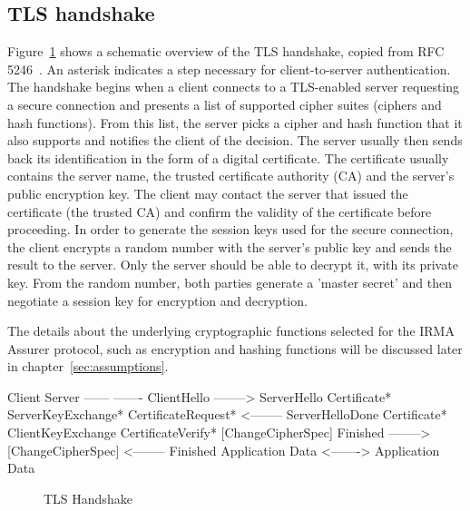 \subsection{TLS handshake}
Figure~\ref{fig:tlshandshake} shows a schematic overview of the TLS handshake, copied from RFC 5246~\cite{tls1.2}. An asterisk indicates a step necessary for client-to-server authentication. The handshake begins when a client connects to a TLS-enabled server requesting a secure connection and presents a list of supported cipher suites (ciphers and hash functions). From this list, the server picks a cipher and hash function that it also supports and notifies the client of the decision. The server usually then sends back its identification in the form of a digital certificate. The certificate usually contains the server name, the trusted certificate authority (CA) and the server's public encryption key. The client may contact the server that issued the certificate (the trusted CA) and confirm the validity of the certificate before proceeding. In order to generate the session keys used for the secure connection, the client encrypts a random number with the server's public key and sends the result to the server. Only the server should be able to decrypt it, with its private key. From the random number, both parties generate a 'master secret' and then negotiate a session key for encryption and decryption.

The details about the underlying cryptographic functions selected for the IRMA Assurer protocol, such as encryption and hashing functions will be discussed later in chapter~\ref{sec:assumptions}.

\begin{verbbox}
Client                                               Server
------                                              -------
ClientHello              -------->
                                                ServerHello
                                               Certificate*
                                         ServerKeyExchange*
                                        CertificateRequest*
                         <--------          ServerHelloDone
Certificate*
ClientKeyExchange
CertificateVerify*
[ChangeCipherSpec]
Finished                 -------->
                                         [ChangeCipherSpec]
                         <--------                 Finished
Application Data         <------->         Application Data
\end{verbbox}

\begin{figure}[htb]
\centering
\theverbbox
\caption{TLS Handshake}
\label{fig:tlshandshake}
\end{figure}

